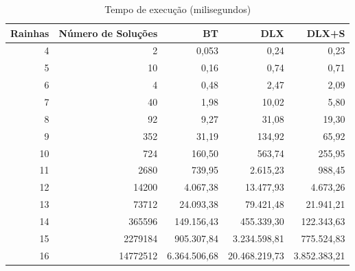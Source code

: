 \documentclass{article}
\begin{document}
\begin{center}
  \begin{table}
  \centering
  \begin{tabular}{ r r r r r }
    Rainhas & Número de Soluções & BT & DLX & DLX+S \\
  \hline
    4  & 2        & 0,053      & 0,24        & 0,23      \\
    5  & 10       & 0,16       & 0,74        & 0,71      \\
    6  & 4        & 0,48       & 2,47        & 2,09      \\
    7  & 40       & 1,98       & 10,02       & 5,80      \\
    8  & 92       & 9,27       & 31,08       & 19,30     \\
    9  & 352      & 31,19      & 134,92      & 65,92     \\
    10 & 724      & 160,50     & 563,74      & 255,95    \\
    11 & 2680     & 739,95     & 2.615,23     & 988,45    \\
    12 & 14200    & 4.067,38    & 13.477,93    & 4.673,26   \\
    13 & 73712    & 24.093,38   & 79.421,48    & 21.941,21  \\
    14 & 365596   & 149.156,43  & 455.339,30   & 122.343,63 \\
    15 & 2279184  & 905.307,84  & 3.234.598,81  & 775.524,83 \\
    16 & 14772512 & 6.364.506,68 & 20.468.219,73 & 3.852.383,21 \\
  \end{tabular}
  \caption{Tempo de execução (milisegundos)}
  \label{tab:tab_2}
  \end{table}
\end{center}
\end{document}
